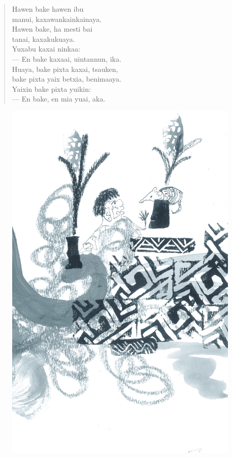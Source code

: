 \begin{verse}
Hawen bake hawen ibu\\
manui, kaxawankainkainaya.\\
Hawen bake, ha mesti bai\\
tanai, kaxakukuaya.\\
Yuxabu kaxai ninkaa:\\
— En bake kaxaai, uintannun, ika.\\
Huaya, bake pixta kaxai, tsauken,\\
bake pixta yaix betxia, benimaaya.\\
Yaixin bake pixta yuikin:\\
— En bake, en mia yuai, aka.
\end{verse}

\vspace*{\fill}

\pagebreak
\thispagestyle{empty}
\begin{figure}
\vspace*{-1.6cm}
\hspace*{-2.2cm}\includegraphics[width=138mm]{./imgs/img11.jpg}
\end{figure}

